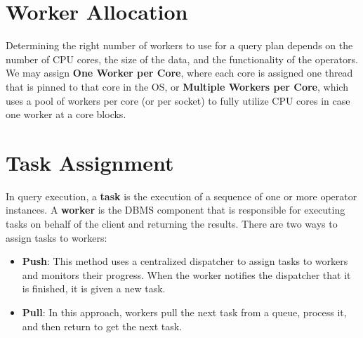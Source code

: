 \documentclass[11pt]{article}
\begin{document}
\section*{Worker Allocation}
Determining the right number of workers to use for a query plan depends on the number of CPU 
cores, the size of the data, and the functionality of the operators. 
We may assign \textbf{One Worker per Core}, where each core is assigned one thread that is pinned 
to that core in the OS, or \textbf{Multiple Workers per Core}, which uses a pool of workers per 
core (or per socket) to fully utilize CPU cores in case one worker at a core blocks.

\section*{Task Assignment}
In query execution, a \textbf{task} is the execution of a sequence of one or more operator 
instances. A \textbf{worker} is the DBMS component that is responsible for executing tasks on 
behalf of the client and returning the results.
There are two ways to assign tasks to workers:
\begin{itemize}
    \item \textbf{Push}: 
    This method uses a centralized dispatcher to assign tasks to workers and monitors their progress. 
    When the worker notifies the dispatcher that it is finished, it is given a new task.
    \item \textbf{Pull}: 
    In this approach, workers pull the next task from a queue, process it, and then return to get the 
    next task.
\end{itemize}

\newpage


\end{document}
